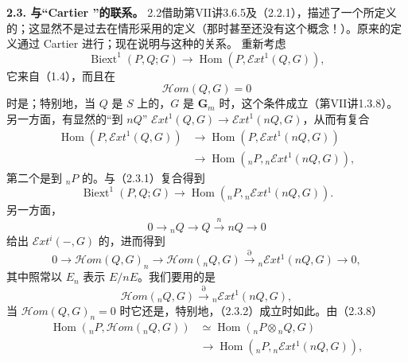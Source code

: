 \textbf{2.3. 与“Cartier ”的联系。} 2.2借助第VII讲3.6.5及（2.2.1），描述了一个所定义的；这显然不是过去在情形采用的定义（那时甚至还没有这个概念！）。原来的定义通过 Cartier 进行；现在说明与这种的关系。
重新考虑
\[\operatorname{Biext}^1(P,Q;G)\longrightarrow\operatorname{Hom}(P,\mathcal Ext^1(Q,G)),\tag{2.3.1}\]
它来自（1.4），而且在
\[\mathcal Hom(Q,G)=0\tag{2.3.2}\]
时是；特别地，当 $Q$ 是 $S$ 上的，$G$ 是 $\mathbf G_m$ 时，这个条件成立（第VII讲1.3.8）。另一方面，有显然的“到 $nQ$” $\mathcal Ext^1(Q,G)\longrightarrow\mathcal Ext^1(nQ,G)$，从而有复合
\[\begin{split}
\operatorname{Hom}(P,\mathcal Ext^1(Q,G))&\longrightarrow\operatorname{Hom}(P,\mathcal Ext^1(nQ,G))\\
&\longrightarrow\operatorname{Hom}({}_nP,{}_n\mathcal Ext^1(nQ,G)),
\end{split}\tag{2.3.4}\]
第二个是到 ${}_nP$ 的。与（2.3.1）复合得到
\[\operatorname{Biext}^1(P,Q;G)\longrightarrow\operatorname{Hom}({}_nP,{}_n\mathcal Ext^1(nQ,G)).\tag{2.3.5}\]
另一方面，
\[0\longrightarrow{}_nQ\longrightarrow Q\xrightarrow{n}nQ\longrightarrow0\tag{2.3.6}\]
给出 $\mathcal Ext^i(-,G)$ 的，进而得到
\[0\longrightarrow\mathcal Hom(Q,G)_n\longrightarrow\mathcal Hom({}_nQ,G)
\xrightarrow{\partial}{}_n\mathcal Ext^1(nQ,G)\longrightarrow0,\tag{2.3.7}\]
其中照常以 $E_n$ 表示 $E/nE$。我们要用的是
\[\mathcal Hom({}_nQ,G)\xrightarrow{\partial}{}_n\mathcal Ext^1(nQ,G),\tag{2.3.8}\]
当 $\mathcal Hom(Q,G)_n=0$ 时它还是，特别地，（2.3.2）成立时如此。由（2.3.8）
\[\begin{split}
\operatorname{Hom}({}_nP,\mathcal Hom({}_nQ,G))&\simeq\operatorname{Hom}({}_nP\otimes{}_nQ,G)\\
&\longrightarrow\operatorname{Hom}({}_nP,{}_n\mathcal Ext^1(nQ,G)),
\end{split}\tag{2.3.9}\]
